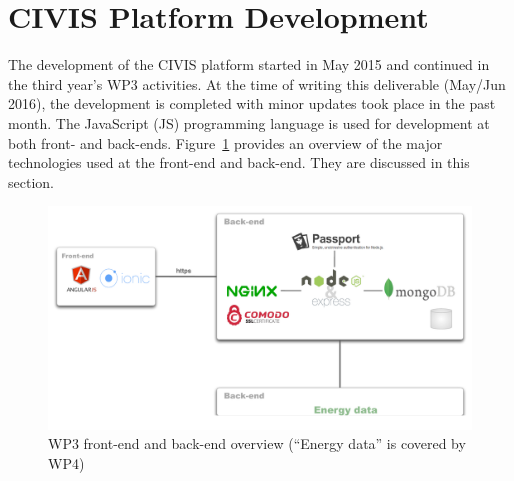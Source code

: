 \section{CIVIS Platform  Development} 
\label{sec:develop}
 
The development of the CIVIS platform started in May 2015 \citep{Huang2015c} and continued in the third year's WP3 activities. At the time of writing this deliverable (May/Jun 2016), the development is completed with minor updates took place in the past month.
% 
The JavaScript (JS) programming language %
is used for development at both front- and back-ends. 
Figure~\ref{fig:ScreenShot2015-11-09at18} provides an overview of the major technologies used at the front-end and back-end. They are discussed in this section. 

\begin{figure}[h!]
\centering
\includegraphics[width=0.9\linewidth]{img/architecture.pdf}
\caption{WP3 front-end and back-end overview (``Energy data'' is covered by WP4)}
\label{fig:ScreenShot2015-11-09at18}
\end{figure}





